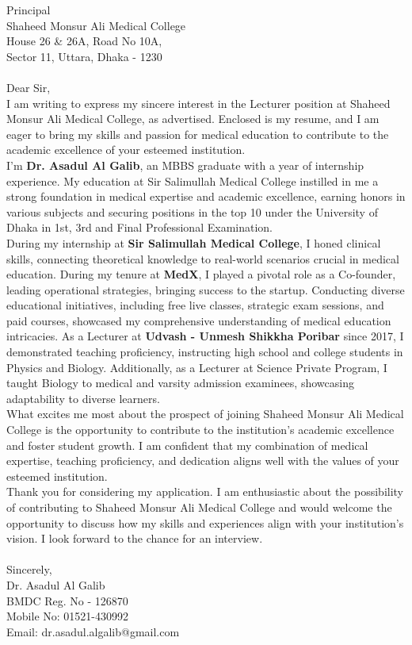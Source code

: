 \documentclass[a4paper,12pt]{article}
\begin{document}
Principal \\
Shaheed Monsur Ali Medical College \\
House 26 \& 26A, Road No 10A, \\
Sector 11, Uttara, Dhaka - 1230 \\ 
\\
Dear Sir, \vspace{5mm}
\\
I am writing to express my sincere interest in the Lecturer position at Shaheed Monsur Ali Medical College, as advertised. 
Enclosed is my resume, and I am eager to bring my skills and passion for medical education to contribute to the academic excellence 
of your esteemed institution. \vspace{5mm}
\\
I'm \textbf{Dr. Asadul Al Galib}, an MBBS graduate with a year of internship experience. My education at Sir Salimullah Medical College 
instilled in me a strong foundation in medical expertise and academic excellence, earning honors in various subjects and 
securing positions in the top 10 under the University of Dhaka in 1st, 3rd and Final Professional Examination. \vspace{5mm}
\\
During my internship at \textbf{Sir Salimullah Medical College}, I honed clinical skills, connecting theoretical knowledge 
to real-world scenarios crucial in medical education. During my tenure at \textbf{MedX}, I played a pivotal role as a Co-founder, 
leading operational strategies, bringing success to the startup. Conducting diverse educational initiatives, including 
free live classes, strategic exam sessions, and paid courses, showcased my comprehensive understanding of medical education intricacies. 
As a Lecturer at \textbf{Udvash - Unmesh Shikkha Poribar} since 2017, I demonstrated teaching proficiency, instructing high school and college students 
in Physics and Biology. Additionally, as a Lecturer at Science Private Program, I taught Biology to medical and varsity admission examinees, 
showcasing adaptability to diverse learners. \vspace{5mm}
\\
What excites me most about the prospect of joining Shaheed Monsur Ali Medical College is the opportunity to contribute 
to the institution's academic excellence and foster student growth. I am confident that my combination of medical expertise, 
teaching proficiency, and dedication aligns well with the values of your esteemed institution. \vspace{5mm}
\\
Thank you for considering my application. I am enthusiastic about the possibility of contributing to 
Shaheed Monsur Ali Medical College and would welcome the opportunity to discuss how my skills and experiences 
align with your institution's vision. I look forward to the chance for an interview. \\
\\
Sincerely, \\
Dr. Asadul Al Galib \\
BMDC Reg. No - 126870 \\ 
Mobile No: 01521-430992 \\
Email: dr.asadul.algalib@gmail.com
\end{document}
